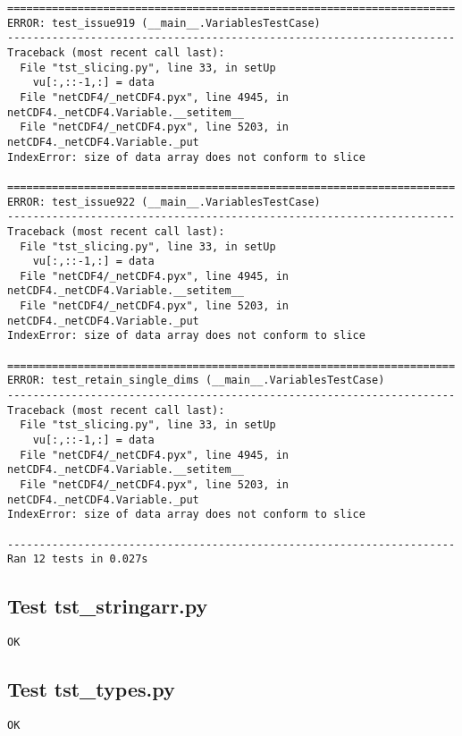 \begin{verbatim}
======================================================================
ERROR: test_issue919 (__main__.VariablesTestCase)
----------------------------------------------------------------------
Traceback (most recent call last):
  File "tst_slicing.py", line 33, in setUp
    vu[:,::-1,:] = data
  File "netCDF4/_netCDF4.pyx", line 4945, in netCDF4._netCDF4.Variable.__setitem__
  File "netCDF4/_netCDF4.pyx", line 5203, in netCDF4._netCDF4.Variable._put
IndexError: size of data array does not conform to slice

======================================================================
ERROR: test_issue922 (__main__.VariablesTestCase)
----------------------------------------------------------------------
Traceback (most recent call last):
  File "tst_slicing.py", line 33, in setUp
    vu[:,::-1,:] = data
  File "netCDF4/_netCDF4.pyx", line 4945, in netCDF4._netCDF4.Variable.__setitem__
  File "netCDF4/_netCDF4.pyx", line 5203, in netCDF4._netCDF4.Variable._put
IndexError: size of data array does not conform to slice

======================================================================
ERROR: test_retain_single_dims (__main__.VariablesTestCase)
----------------------------------------------------------------------
Traceback (most recent call last):
  File "tst_slicing.py", line 33, in setUp
    vu[:,::-1,:] = data
  File "netCDF4/_netCDF4.pyx", line 4945, in netCDF4._netCDF4.Variable.__setitem__
  File "netCDF4/_netCDF4.pyx", line 5203, in netCDF4._netCDF4.Variable._put
IndexError: size of data array does not conform to slice

----------------------------------------------------------------------
Ran 12 tests in 0.027s
\end{verbatim}

\subsection{Test tst\_stringarr.py}

\begin{verbatim}
OK
\end{verbatim}

\subsection{Test tst\_types.py}

\begin{verbatim}
OK
\end{verbatim}

